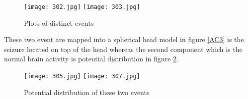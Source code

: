 \begin{figure}[!htbp]
%
\centering
\texttt{[image: 302.jpg]}
\label{AC1}
\endminipage\hfill
{}%
\centering
\texttt{[image: 303.jpg]}
\label{AC2}
\endminipage\hfill
\caption{Plots of distinct events}
\end{figure}

These two event are mapped into a spherical head model in figure \ref{AC3} is the seizure located on top of the head whereas the second component which is the normal brain activity is potential distribution in figure \ref{AC4}.


\begin{figure}[!htbp]
%
\centering
\texttt{[image: 305.jpg]}
\label{AC3}
\endminipage\hfill
{}%
\centering
\texttt{[image: 307.jpg]}
\label{AC4}
\endminipage\hfill
\caption{Potential distribution of these two events}
\end{figure}
